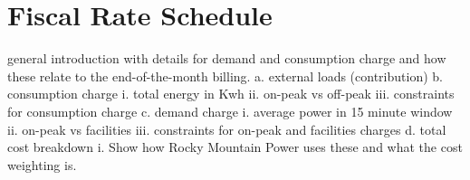 \section{Fiscal Rate Schedule}
general introduction with details for demand and consumption charge and how these relate to the end-of-the-month billing.
    a. external loads (contribution)
    b. consumption charge
        i. total energy in Kwh
	ii. on-peak vs off-peak
	iii. constraints for consumption charge
    c. demand charge
        i. average power in 15 minute window
	ii. on-peak vs facilities 
	iii. constraints for on-peak and facilities charges
    d. total cost breakdown
        i. Show how Rocky Mountain Power uses these and what the cost weighting is.

